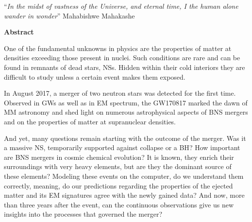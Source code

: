 \documentclass[
openright,
12pt, %
english,%
onehalfspacing, %
nolistspacing, %
nohyperref, %
headsepline, %
]{MastersDoctoralThesis} %
\newcommand{\GW}{GW170817}
\begin{document}
\noindent\enquote{\itshape In the midst of vastness of the Universe, and eternal time, I the human alone wander in wonder}\bigbreak
\hfill Mahabishwe Mahakashe

\cleardoublepage

%    
%    
%    
    \textbf{Abstract}
    
    One of the fundamental unknowns in physics are the properties 
    of matter at densities exceeding those present in nuclei. Such conditions are 
    rare and can be found in remnants of dead stars, \acp{NS}. Hidden within 
    their cold interiors they are difficult to study unless a certain event makes them exposed. 
    
    In August 2017, a merger of two neutron stars was detected for the first 
    time. Observed in \acp{GW} as well as in \ac{EM} spectrum, the \GW{} marked the dawn of 
    \ac{MM} astronomy and shed light on numerous astrophysical aspects of \ac{BNS} 
    mergers and on the properties of matter at supranuclear densities. 
    
    And yet, many questions remain starting with the outcome of the merger. Was it a 
    massive \ac{NS}, temporarily supported against collapse or a \ac{BH}? How important are 
    \ac{BNS} mergers in cosmic chemical evolution? It is known, they enrich their 
    surroundings with very heavy elements, but are they the dominant source of these elements?
    Modeling these events on the computer, do we understand them correctly, meaning,  
    do our predictions regarding the properties of the ejected matter and its \ac{EM} 
    signatures agree with the newly gained data? And now, more than three years after the 
    event, can the continuous observations give us new insights into the processes that 
    governed the merger?
    
\end{document}
